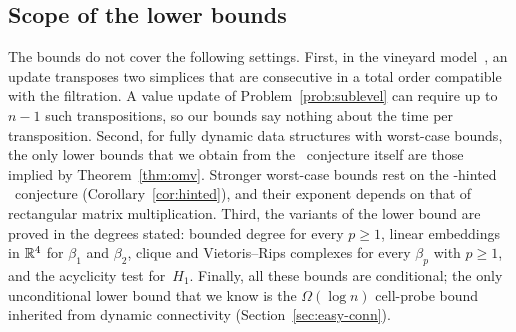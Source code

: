 \subsection{Scope of the lower bounds}\label{sec:lower-scope}

The bounds do not cover the following settings.
First, in the vineyard model~\cite{CEMS06}, an update transposes two simplices that are consecutive in a total order compatible with the filtration.
A value update of Problem~\ref{prob:sublevel} can require up to $n-1$ such transpositions, so our bounds say nothing about the time per transposition.
Second, for fully dynamic data structures with worst-case bounds, the only lower bounds that we obtain from the \OMv\ conjecture itself are those implied by Theorem~\ref{thm:omv}.
Stronger worst-case bounds rest on the \uMv-hinted \uMv\ conjecture (Corollary~\ref{cor:hinted}), and their exponent depends on that of rectangular matrix multiplication.
Third, the variants of the lower bound are proved in the degrees stated: bounded degree for every $p\ge1$, linear embeddings in $\mathbb{R}^4$ for $\beta_1$ and $\beta_2$, clique and Vietoris--Rips complexes for every $\beta_p$ with $p\ge1$, and the acyclicity test for~$H_1$.
Finally, all these bounds are conditional; the only unconditional lower bound that we know is the $\Omega(\log n)$ cell-probe bound inherited from dynamic connectivity (Section~\ref{sec:easy-conn}).
